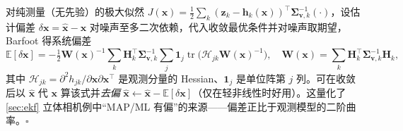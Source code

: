 \begin{derivation}
对纯测量（无先验）的极大似然 $J(\mathbf{x})=\tfrac12\sum_k(\mathbf{z}_k-\mathbf{h}_k(\mathbf{x}))^\top\boldsymbol{\Sigma}_{\mathbf{v},k}^{-1}(\cdot)$，设估计偏差 $\delta\mathbf{x}=\hat{\mathbf{x}}-\mathbf{x}$ 对噪声至多二次依赖，代入收敛最优条件并对噪声取期望，Barfoot\cite{barfoot2024state} 得系统偏差
\[
  \mathbb{E}[\delta\mathbf{x}]=-\tfrac12\mathbf{W}(\mathbf{x})^{-1}\sum_k\mathbf{H}_k^\top\boldsymbol{\Sigma}_{\mathbf{v},k}^{-1}\sum_j\mathbf{1}_j\operatorname{tr}\!\big(\boldsymbol{\mathcal{H}}_{jk}\mathbf{W}(\mathbf{x})^{-1}\big),\quad
  \mathbf{W}(\mathbf{x})=\sum_k\mathbf{H}_k^\top\boldsymbol{\Sigma}_{\mathbf{v},k}^{-1}\mathbf{H}_k,
\]
其中 $\boldsymbol{\mathcal{H}}_{jk}=\partial^2 h_{jk}/\partial\mathbf{x}\partial\mathbf{x}^\top$ 是观测分量的 Hessian、$\mathbf{1}_j$ 是单位阵第 $j$ 列。可在收敛后以 $\hat{\mathbf{x}}$ 代 $\mathbf{x}$ 算该式并\emph{去偏} $\hat{\mathbf{x}}\leftarrow\hat{\mathbf{x}}-\mathbb{E}[\delta\mathbf{x}]$（仅在轻非线性时好用）。这量化了 \cref{sec:ekf} 立体相机例中“MAP/ML 有偏”的来源——偏差正比于观测模型的二阶曲率。\hfill$\square$
\end{derivation}
